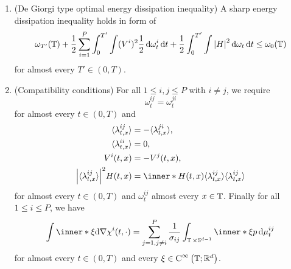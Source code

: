 \begin{definition}
\begin{enumerate}
	\item (De Giorgi type optimal energy dissipation inequality)
	A sharp energy dissipation inequality holds in form of
	\begin{equation}
		\label{equation_varifold_energy_dissipation_inequality}
		\omega_{ T' } ( \operatorname{\mathbb{T}} )
		+
		\frac{ 1 }{ 2 }
		\sum_{ i = 1 }^{ P }
			\int_{ 0 }^{ T' }
				\int
					( V^{ i } )^{ 2 }
					\frac{ 1 }{ 2 }
				\dd{ \omega_{ t }^{ i } }
			\dd{ t }
		+
		\frac{ 1 }{ 2 }
		\int_{ 0 }^{ T' }
			\int
				\abs{ H }^{ 2 }
			\dd{ \omega_{ t } }
		\dd{ t }
		\leq
		\omega_{ 0 } ( \operatorname{\mathbb{T}} )
	\end{equation}
	for almost every $ T' \in ( 0 , T ) $.
	
	\item (Compatibility conditions)
	For all $ 1 \leq i , j \leq P $ with $ i \neq j $, we require 
	\begin{equation}
		\label{varifold_symmetry_of_energy_measures}
		\omega_{ t }^{ i j }
		=
		\omega_{ t }^{ j i } 
	\end{equation}
	for almost every $ t \in ( 0 , T ) $ and
	\begin{align}
		\label{varifold_symmetry_expectations}
		\langle \lambda_{ t, x  }^{ i j } \rangle
		&= 
		- \langle \lambda_{ t, x  }^{ j i } \rangle,
		\\
		\label{varifold_expecation_of_ii_zero}
		\langle \lambda_{ t , x }^{ i i } \rangle
		&= 
		0,
		\\
		\label{varifold_symmetry_velocities}
		V^{ i } ( t, x ) 
		&= 
		- V^{ j } ( t, x ),
		\\
		\label{varifold_mean_curvature_points_in_normal_direction}
		\abs{ \langle \lambda_{ t , x }^{ i j } \rangle }^{ 2 }
		H ( t, x )
		& =
		\inner*{ H( t , x ) }{ \langle \lambda_{ t , x }^{ i j } \rangle }
		\langle \lambda_{ t , x }^{ i j } \rangle
	\end{align}
	for almost every $ t \in ( 0 , T ) $ and $ \omega_{ t }^{ i j } $ 
	almost every $ x \in \operatorname{\mathbb{T}} $. Finally for all $ 1 \leq i \leq P $, we 
	have
	\begin{equation}
		\label{varifold_compatibility_condition_multiphase}
		\int
			\inner*{ \xi }{ \dd{ \nabla \chi^{ i } ( t , \cdot ) } }
		=
		\sum_{ j = 1 , j \neq i }^{ P }
			\frac{ 1 }{ \sigma_{ i j } }
			\int_{ \flattorus \times \mathbb{ S }^{ d - 1 } }
				\inner*{ \xi }{ p }
			\dd{ \mu_{ t }^{ i j } }
	\end{equation}
	for almost every $ t \in ( 0 , T ) $ and every $ \xi \in \operatorname{C}^{ 
	\infty } \left( \operatorname{\mathbb{T}} ; \mathbb{ R }^{ d } \right) $.
	\end{enumerate}
\end{definition}

